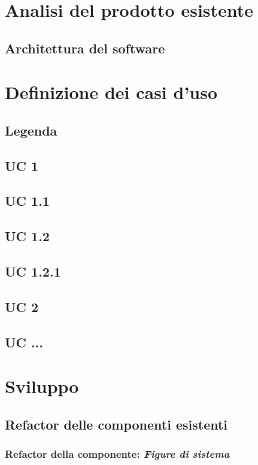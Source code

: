
\section{Analisi del prodotto esistente}
\subsection{Architettura del software}



\section{Definizione dei casi d'uso}
	\subsection{Legenda}
	\subsection{UC 1}
	\subsection{UC 1.1}
	\subsection{UC 1.2}
	\subsection{UC 1.2.1}
	\subsection{UC 2}	
	\subsection{UC ...}

\section{Sviluppo}
\subsection{Refactor delle componenti esistenti}
	
\subsubsection{Refactor della componente: \textit{Figure di sistema}}
